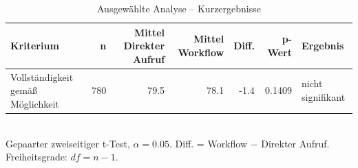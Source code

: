 \begin{table}[htbp]
\centering
\caption{Ausgewählte Analyse -- Kurzergebnisse}
\begin{tabular}{lrrrrrl}
\toprule
Kriterium & n & Mittel Direkter Aufruf & Mittel Workflow & Diff. & p-Wert & Ergebnis \\
\midrule
Vollständigkeit gemäß Möglichkeit & 780 & 79.5 & 78.1 & -1.4 & 0.1409 & nicht signifikant \\
\bottomrule
\end{tabular}
\\[2mm]
\footnotesize Gepaarter zweiseitiger t-Test, $\alpha=0.05$. Diff. = Workflow $-$ Direkter Aufruf. Freiheitsgrade: $df=n-1$.
\end{table}
